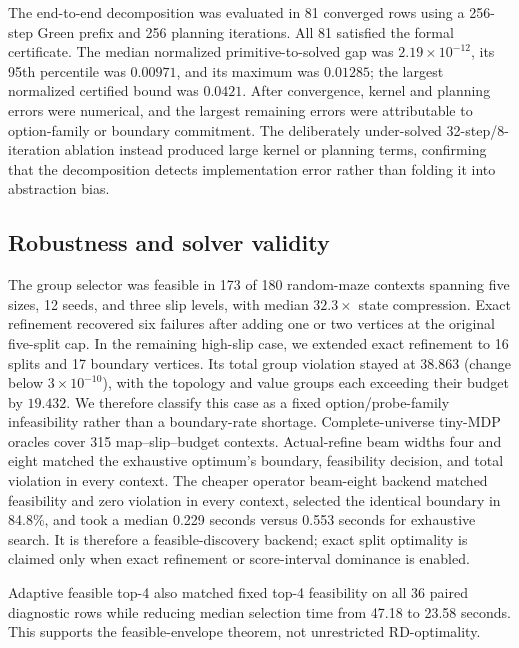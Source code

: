 \documentclass[10pt]{article}
\begin{document}
The end-to-end decomposition was evaluated in 81 converged rows using a
256-step Green prefix and 256 planning iterations. All 81 satisfied the formal
certificate. The median normalized primitive-to-solved gap was
$2.19\times10^{-12}$, its 95th percentile was $0.00971$, and its maximum was
$0.01285$; the largest normalized certified bound was $0.0421$. After
convergence, kernel and planning errors were numerical, and the largest
remaining errors were attributable to option-family or boundary commitment.
The deliberately under-solved 32-step/8-iteration ablation instead produced
large kernel or planning terms, confirming that the decomposition detects
implementation error rather than folding it into abstraction bias.

\subsection{Robustness and solver validity}
The group selector was feasible in 173 of 180 random-maze contexts spanning
five sizes, 12 seeds, and three slip levels, with median $32.3\times$ state
compression. Exact refinement recovered six failures after adding one or two
vertices at the original five-split cap. In the remaining high-slip case, we
extended exact refinement to 16 splits and 17 boundary vertices. Its total
group violation stayed at $38.863$ (change below $3\times10^{-10}$), with the
topology and value groups each exceeding their budget by $19.432$. We therefore
classify this case as a fixed option/probe-family infeasibility rather than a
boundary-rate shortage. Complete-universe tiny-MDP oracles cover 315
map--slip--budget contexts. Actual-refine beam widths four and eight matched the
exhaustive optimum's boundary, feasibility decision, and total violation in
every context. The cheaper operator beam-eight backend matched feasibility and
zero violation in every context, selected the identical boundary in 84.8\%,
and took a median 0.229 seconds versus 0.553 seconds for exhaustive search. It
is therefore a feasible-discovery backend; exact split optimality is claimed
only when exact refinement or score-interval dominance is enabled.

Adaptive feasible top-4 also matched fixed top-4 feasibility on all 36 paired
diagnostic rows while reducing median selection time from 47.18 to 23.58
seconds. This supports the feasible-envelope theorem, not unrestricted
RD-optimality.
\end{document}
